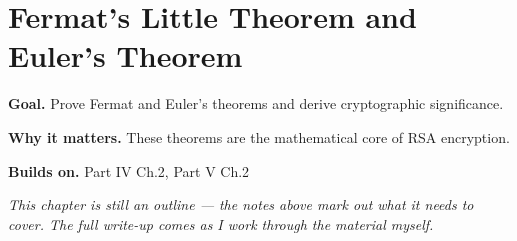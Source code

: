 \chapter{Fermat's Little Theorem and Euler's Theorem}
\label{ch:05-number-theory-05}

\begin{chapterintro}
\textbf{Goal.} Prove Fermat and Euler's theorems and derive cryptographic significance.

\textbf{Why it matters.} These theorems are the mathematical core of RSA encryption.

\textbf{Builds on.} Part IV Ch.2, Part V Ch.2
\end{chapterintro}

\textit{This chapter is still an outline --- the notes above mark out what it needs to cover. The full write-up comes as I work through the material myself.}
